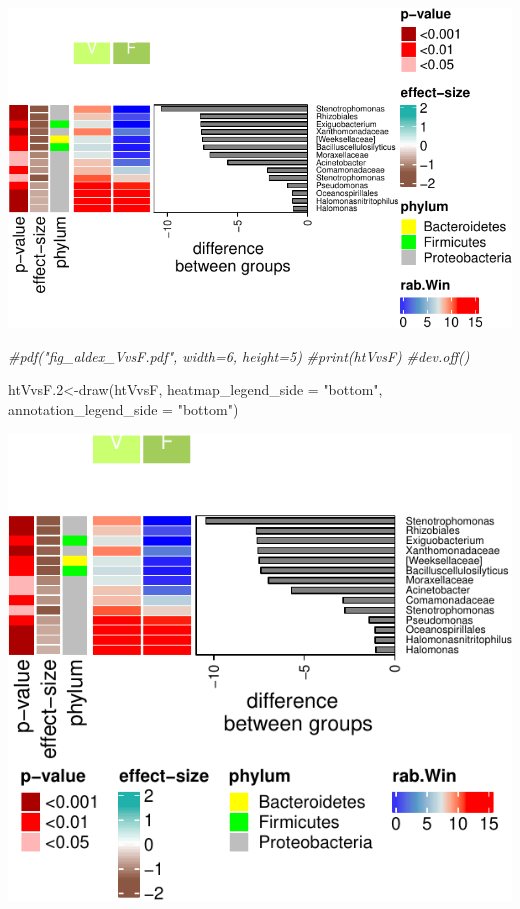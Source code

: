 \documentclass[]{interact}
\theoremstyle{plain}%
\theoremstyle{definition}
\theoremstyle{remark}
\newenvironment{Shaded}{\begin{snugshade}}{\end{snugshade}}
\newcommand{\AttributeTok}[1]{\textcolor[rgb]{0.77,0.63,0.00}{#1}}
\newcommand{\CommentTok}[1]{\textcolor[rgb]{0.56,0.35,0.01}{\textit{#1}}}
\newcommand{\FloatTok}[1]{\textcolor[rgb]{0.00,0.00,0.81}{#1}}
\newcommand{\FunctionTok}[1]{\textcolor[rgb]{0.00,0.00,0.00}{#1}}
\newcommand{\NormalTok}[1]{#1}
\newcommand{\OtherTok}[1]{\textcolor[rgb]{0.56,0.35,0.01}{#1}}
\newcommand{\StringTok}[1]{\textcolor[rgb]{0.31,0.60,0.02}{#1}}
\begin{document}
\begin{center}\includegraphics{Doc_pdf_files/figure-latex/unnamed-chunk-34-1} \end{center}

\begin{Shaded}
\begin{Highlighting}[]
\CommentTok{\#pdf("fig\_aldex\_VvsF.pdf", width=6, height=5)}
\CommentTok{\#print(htVvsF)}
\CommentTok{\#dev.off()}

\NormalTok{htVvsF}\FloatTok{.2}\OtherTok{\textless{}{-}}\FunctionTok{draw}\NormalTok{(htVvsF, }\AttributeTok{heatmap\_legend\_side =} \StringTok{"bottom"}\NormalTok{, }
               \AttributeTok{annotation\_legend\_side =} \StringTok{"bottom"}\NormalTok{)}
\end{Highlighting}
\end{Shaded}

\begin{center}\includegraphics{Doc_pdf_files/figure-latex/unnamed-chunk-34-2} \end{center}
\end{document}
